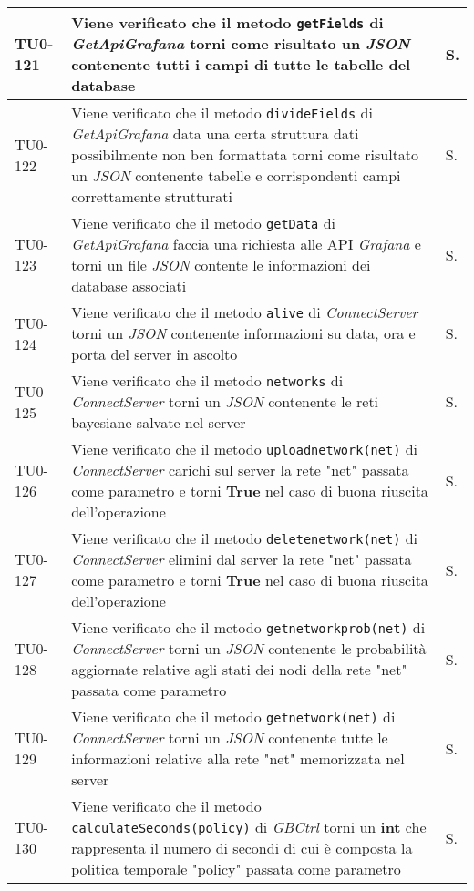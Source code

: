\begin{longtable}{|C{.15\textwidth}|m{.66\textwidth}|C{.10\textwidth}|}
\hline
{}TU0-121 & Viene verificato che il metodo \texttt{getFields} di \textit{GetApiGrafana} torni come risultato un \textit{JSON} contenente tutti i campi di tutte le tabelle del database & S.\\
\hline
TU0-122 & Viene verificato che il metodo \texttt{divideFields} di \textit{GetApiGrafana} data una certa struttura dati possibilmente non ben formattata torni come risultato un \textit{JSON} contenente tabelle e corrispondenti campi correttamente strutturati & S.\\
\hline
{}TU0-123 & Viene verificato che il metodo \texttt{getData} di \textit{GetApiGrafana} faccia una richiesta alle API \textit{Grafana} e torni un file \textit{JSON} contente le informazioni dei database associati & S.\\
\hline
TU0-124 & Viene verificato che il metodo \texttt{alive} di \textit{ConnectServer} torni un \textit{JSON} contenente informazioni su data, ora e porta del server in ascolto & S.\\
\hline
{}TU0-125 & Viene verificato che il metodo \texttt{networks} di \textit{ConnectServer} torni un \textit{JSON} contenente le reti bayesiane salvate nel server & S.\\
\hline
TU0-126 & Viene verificato che il metodo \texttt{uploadnetwork(net)} di \textit{ConnectServer} carichi sul server la rete "net" passata come parametro e torni \textbf{True} nel caso di buona riuscita dell'operazione & S.\\
\hline
{}TU0-127 & Viene verificato che il metodo \texttt{deletenetwork(net)} di \textit{ConnectServer} elimini dal server la rete "net" passata come parametro e torni \textbf{True} nel caso di buona riuscita dell'operazione & S.\\
\hline
TU0-128 & Viene verificato che il metodo \texttt{getnetworkprob(net)} di \textit{ConnectServer} torni un \textit{JSON} contenente le probabilità aggiornate relative agli stati dei nodi della rete "net" passata come parametro & S.\\
\hline
{}TU0-129 & Viene verificato che il metodo \texttt{getnetwork(net)} di \textit{ConnectServer} torni un \textit{JSON} contenente tutte le informazioni relative alla rete "net" memorizzata nel server & S.\\
\hline
TU0-130 & Viene verificato che il metodo \texttt{calculateSeconds(policy)} di \textit{GBCtrl} torni un \textbf{int} che rappresenta il numero di secondi di cui è composta la politica temporale "policy" passata come parametro & S.\\

\end{longtable}

